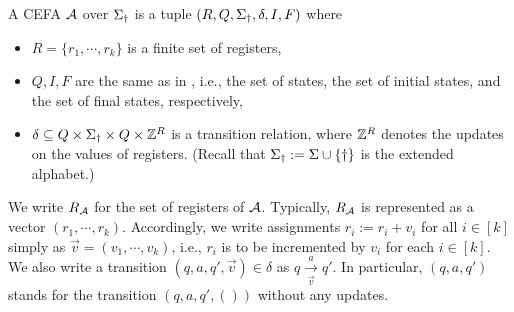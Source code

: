 {%
A CEFA $\mathcal{A}$ over $\Sigma_{\dag}$ is a  tuple $(R, Q, \Sigma_{\dag}, \delta, I, F)$ where
	\begin{itemize}
		\item $R = \{r_1, \cdots, r_k\}$ is a finite set of registers,
		\item $Q, I, F$ are the same as in {\nfa}, i.e., the set of states, the set of initial states, and the set of final states, respectively, 
		\item $\delta \subseteq Q \times \Sigma_{\dag} \times Q \times \mathbb{Z}^R$ is a transition relation, where $\mathbb{Z}^R$ denotes the updates on the values of registers. (Recall that $\Sigma_{\dag}:=\Sigma \cup \{\dag\}$ is the extended alphabet.)
	\end{itemize}
We write $R_{\mathcal{A}}$ for the set of registers of $\mathcal{A}$. %
Typically, $R_{\mathcal{A}}$ is represented as a vector $(r_1, \cdots, r_k)$. Accordingly, we write assignments $r_i:= r_i + v_i$ for all $i\in [k]$ simply as 
$\vec{v}=(v_1, \cdots, v_k)$, i.e., $r_i$ is to be incremented by $v_i$ for each $i \in [k]$. We also write a transition $(q, a, q', \vec{v}) \in \delta$ as $q \xrightarrow[\vec{v}]{a} q'$. In particular, $(q,a,q')$ stands for the transition $(q,a,q',())$ without any updates.

}
